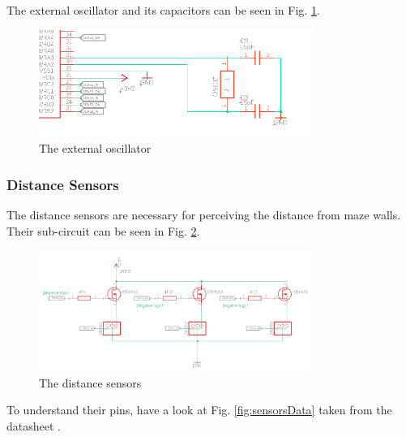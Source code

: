 
The external oscillator and its capacitors can be seen in Fig. \ref{fig:oscillator}.

\begin{figure}[htb]
    \centering
    \includegraphics[width=0.8\textwidth]{figures/hardware/Oscillator.PNG}
    \caption{The external oscillator}
    \label{fig:oscillator}
\end{figure}

\FloatBarrier
\vspace{1cm}


\subsubsection{Distance Sensors}

The distance sensors are necessary for perceiving the distance from maze walls. Their sub-circuit can be seen in Fig. \ref{fig:sensors}.

\begin{figure}[htb]
    \centering
    \includegraphics[width=0.8\textwidth]{figures/hardware/DistanceSensors.PNG}
    \caption{The distance sensors}
    \label{fig:sensors}
\end{figure}

\FloatBarrier

To understand their pins, have a look at Fig. \ref{fig:sensorsData} taken from the datasheet \cite{sens}.

